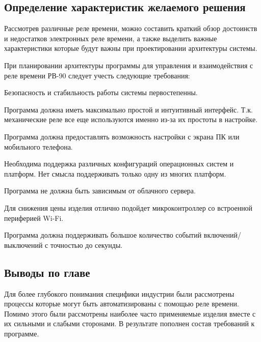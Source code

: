 \filbreak
\subsection{Определение характеристик желаемого решения}

Рассмотрев различные реле времени, можно составить краткий обзор достоинств и недостатков электронных реле времени, а также выделить важные характеристики которые будут важны при проектировании архитектуры системы.


При планировании архитектуры программы для управления и взаимодействия с реле времени РВ-90 следует учесть следующие требования:
\begin{my_itemize}
\item Безопасность и стабильность работы системы первостепенны.
\item Программа должна иметь максимально простой и интуитивный интерфейс. Т.к. механические реле все еще используются именно из-за их простоты в настройке.
\item Программа должна предоставлять возможность настройки с экрана ПК или мобильного телефона.  
\item Необходима поддержка различных конфигураций операционных систем и платформ. Нет смысла поддерживать только одну из многих платформ.
\item Программа не должна быть зависимым от облачного сервера.
\item Для снижения цены изделия отлично подойдет микроконтроллер со встроенной периферией Wi-Fi.
\item Программа должна поддерживать большое количество событий включений/выключений с точностью до секунды.
\end{my_itemize}


\subsection{Выводы по главе}
Для более глубокого понимания специфики индустрии были рассмотрены процессы которые могут быть автоматизированы с помощью реле времени. Помимо этого были рассмотрены наиболее часто применяемые изделия вместе с их сильными и слабыми сторонами. В результате пополнен состав требований к программе.






